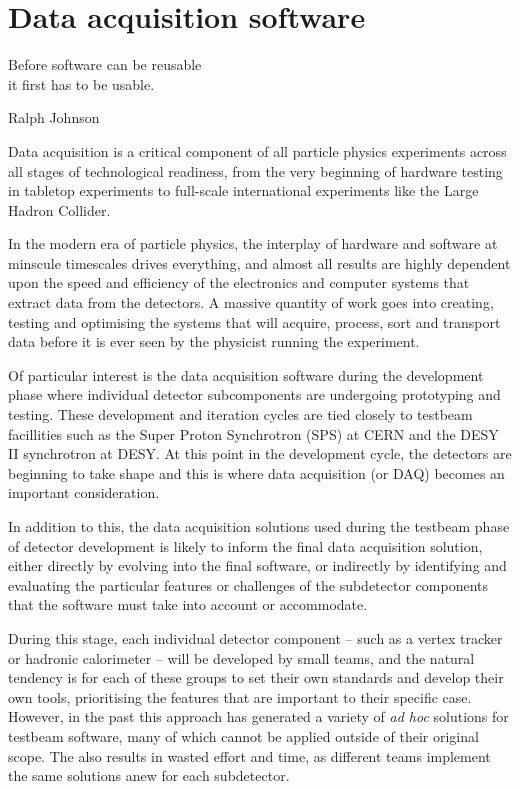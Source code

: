 \chapter{Data acquisition software}

\epigraph{Before software can be reusable \\it first has to be usable.}{Ralph Johnson}

Data acquisition is a critical component of all particle physics experiments across all stages of technological readiness, from the very beginning of hardware testing in tabletop experiments to full-scale international experiments like the Large Hadron Collider. 

In the modern era of particle physics, the interplay of hardware and software at minscule timescales drives everything, and almost all results are highly dependent upon the speed and efficiency of the electronics and computer systems that extract data from the detectors. A massive quantity of work goes into creating, testing and optimising the systems that will acquire, process, sort and transport data before it is ever seen by the physicist running the experiment.

Of particular interest is the data acquisition software during the development phase where individual detector subcomponents are undergoing prototyping and testing. These development and iteration cycles are tied closely to testbeam facillities such as the Super Proton Synchrotron (SPS) at CERN and the DESY II synchrotron at DESY. At this point in the development cycle, the detectors are beginning to take shape and this is where data acquisition (or DAQ) becomes an important consideration. 

In addition to this, the data acquisition solutions used during the testbeam phase of detector development is likely to inform the final data acquisition solution, either directly by evolving into the final software, or indirectly by identifying and evaluating the particular features or challenges of the subdetector components that the software must take into account or accommodate.

During this stage, each individual detector component -- such as a vertex tracker or hadronic calorimeter -- will be developed by small teams, and the natural tendency is for each of these groups to set their own standards and develop their own tools, prioritising the features that are important to their specific case. However, in the past this approach has generated a variety of \textit{ad hoc} solutions for testbeam software, many of which cannot be applied outside of their original scope. The also results in wasted effort and time, as different teams implement the same solutions anew for each subdetector.

